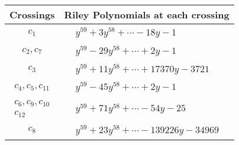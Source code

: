 \documentclass[1p]{elsarticle_modified}
\theoremstyle{definition}
\begin{document}
\begin{tabular}{m{50pt}|m{274pt}}
Crossings & \hspace{64pt}Riley Polynomials at each crossing \\
\hline $$\begin{aligned}c_{1}\end{aligned}$$&$\begin{aligned}
&y^{59}+3 y^{58}+\cdots-18 y-1
\end{aligned}$\\
\hline $$\begin{aligned}c_{2},c_{7}\end{aligned}$$&$\begin{aligned}
&y^{59}-29 y^{58}+\cdots+2 y-1
\end{aligned}$\\
\hline $$\begin{aligned}c_{3}\end{aligned}$$&$\begin{aligned}
&y^{59}+11 y^{58}+\cdots+17370 y-3721
\end{aligned}$\\
\hline $$\begin{aligned}c_{4},c_{5},c_{11}\end{aligned}$$&$\begin{aligned}
&y^{59}-45 y^{58}+\cdots+2 y-1
\end{aligned}$\\
\hline $$\begin{aligned}c_{6},c_{9},c_{10}\\c_{12}\end{aligned}$$&$\begin{aligned}
&y^{59}+71 y^{58}+\cdots-54 y-25
\end{aligned}$\\
\hline $$\begin{aligned}c_{8}\end{aligned}$$&$\begin{aligned}
&y^{59}+23 y^{58}+\cdots-139226 y-34969
\end{aligned}$\\
\hline
\end{tabular}
\vskip 2pc
\end{document}
